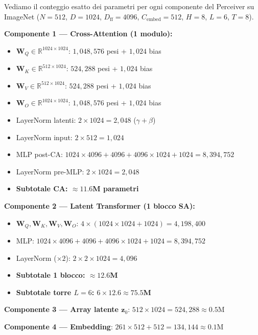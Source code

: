 \documentclass[12pt,a4paper]{article}
\begin{document}
\begin{examplebox}
Vediamo il conteggio esatto dei parametri per ogni componente del Perceiver su ImageNet ($N = 512$, $D = 1024$, $D_{\text{ff}} = 4096$, $C_{\text{embed}} = 512$, $H = 8$, $L = 6$, $T = 8$).

\textbf{Componente 1 --- Cross-Attention (1 modulo):}
\begin{itemize}
\item $\mathbf{W}_Q \in \mathbb{R}^{1024 \times 1024}$: $1{,}048{,}576$ pesi + $1{,}024$ bias
\item $\mathbf{W}_K \in \mathbb{R}^{512 \times 1024}$: $524{,}288$ pesi + $1{,}024$ bias
\item $\mathbf{W}_V \in \mathbb{R}^{512 \times 1024}$: $524{,}288$ pesi + $1{,}024$ bias
\item $\mathbf{W}_O \in \mathbb{R}^{1024 \times 1024}$: $1{,}048{,}576$ pesi + $1{,}024$ bias
\item LayerNorm latenti: $2 \times 1024 = 2{,}048$ ($\gamma + \beta$)
\item LayerNorm input: $2 \times 512 = 1{,}024$
\item MLP post-CA: $1024 \times 4096 + 4096 + 4096 \times 1024 + 1024 = 8{,}394{,}752$
\item LayerNorm pre-MLP: $2 \times 1024 = 2{,}048$
\item \textbf{Subtotale CA: $\approx 11.6$M parametri}
\end{itemize}

\textbf{Componente 2 --- Latent Transformer (1 blocco SA):}
\begin{itemize}
\item $\mathbf{W}_Q, \mathbf{W}_K, \mathbf{W}_V, \mathbf{W}_O$: $4 \times (1024 \times 1024 + 1024) = 4{,}198{,}400$
\item MLP: $1024 \times 4096 + 4096 + 4096 \times 1024 + 1024 = 8{,}394{,}752$
\item LayerNorm ($\times 2$): $2 \times 2 \times 1024 = 4{,}096$
\item \textbf{Subtotale 1 blocco: $\approx 12.6$M}
\item \textbf{Subtotale torre $L{=}6$: $6 \times 12.6 \approx 75.5$M}
\end{itemize}

\textbf{Componente 3 --- Array latente $\mathbf{z}_0$}: $512 \times 1024 = 524{,}288 \approx 0.5$M

\textbf{Componente 4 --- Embedding}: $261 \times 512 + 512 = 134{,}144 \approx 0.1$M


\end{examplebox}
\end{document}
